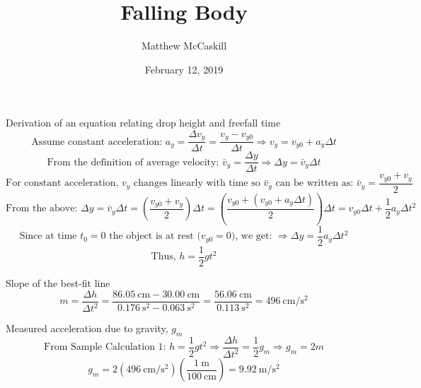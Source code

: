 \documentclass[12pt]{article}
\title{Falling Body}
\author{Matthew McCaskill}
\date{February 12, 2019}
\newcommand{\paren}[1]{\left(#1\right)}
\begin{document}
    \maketitle
    
    
    \begin{samplecalculations}
    	\begin{calculation}{Derivation of an equation relating drop height and freefall time}%
    		$$\text{Assume constant acceleration: }a_y=\frac{\Delta v_y}{\Delta t}=\frac{v_y-v_{y0}}{\Delta t}\Rightarrow v_y=v_{y0}+a_y\Delta t$$
    		$$\text{From the definition of average velocity: }\bar{v}_y=\frac{\Delta y}{\Delta t}\Rightarrow\Delta y=\bar{v}_y\Delta t$$
    		$$\text{For constant acceleration, $v_y$ changes linearly with time so $\bar{v}_y$ can be written as: }\bar{v}_y=\frac{v_{y0}+v_{y}}{2}$$
    		$$\text{From the above: }\Delta y=\bar{v}_y\Delta t=\paren{\frac{v_{y0}+v_{y}}{2}}\Delta t=\paren{\frac{v_{y0}+\paren{v_{y0}+a_y\Delta t}}{2}}\Delta t=v_{y0}\Delta t+\frac12a_y\Delta t^2$$
    		$$\text{Since at time $t_0=0$ the object is at rest ($v_{y0}=0$), we get: }\Rightarrow\Delta y=\frac12a_y\Delta t^2$$
    		$$\text{Thus, }h=\frac12gt^2$$
    	\end{calculation}
    
    	\begin{calculation}{Slope of the best-fit line}%
    		$$m=\frac{\Delta h}{\Delta t^2}=\frac{\SI{86.05}{\centi\meter}-\SI{30.00}{\centi\meter}}{\SI{0.176}{\second^2}-\SI{0.063}{\second^2}}=\frac{\SI{56.06}{\centi\meter}}{\SI{0.113}{\second^2}}=\SI{496}{\centi\meter/\second^2}$$
    	\end{calculation}
    
    	\begin{calculation}{Measured acceleration due to gravity, $g_m$}%
    		$$\text{From Sample Calculation 1: }h=\frac12gt^2\Rightarrow \frac{\Delta h}{\Delta t^2}=\frac12g_m\Rightarrow g_m=2m$$
    		$$g_m=2\paren{\SI{496}{\centi\meter/\second^2}}\paren{\frac{\SI{1}{\meter}}{\SI{100}{\centi\meter}}}=\SI{9.92}{\meter/\second^2}$$
    	\end{calculation}
    

\end{samplecalculations}
\end{document}
